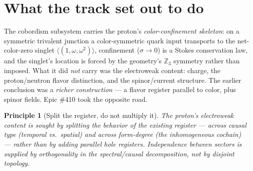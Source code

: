 \documentclass[11pt]{article}
\newtheorem{principle}{Principle}
\theoremstyle{definition}
\newcommand{\Z}{\mathbb{Z}}
\newcommand{\sigmacol}{\sigma}
\newcommand{\code}[1]{\texttt{#1}}
\begin{document}
\begin{abstract}
construction. The dimensional spike (\#418) and the dimension-generic apex interior (\#429,
\code{symmetricStackCells(nApexSlices)} with a rigorous \code{dualComplexIsValid} for
$n\ge4$, validated as a $4$-manifold over a tetrahedral $S^3$) scope the $3+1$\,D home and
expose the emergent twist as a PT-symmetric structure --- correctly read as
\emph{localized to creation/annihilation vertices} (St\"uckelberg--Feynman), not a
per-slice alternation. Finally, the track's findings force an \textbf{architecture pivot}:
the proton is assembled from \emph{sequences of bipartite junctions} relaxed in
\emph{one global step} with color-emergent creation, and the tripartite $W_{ABC}$ is
dropped. Charge lives in the emergent temporal sector, color in the register: the
charge\,$\otimes$\,color thesis. All numbers below are measured through the production
C++ and its Python suite; the open work (named, not created) is collected at the end.
\end{abstract}

\tableofcontents

\section{What the track set out to do}
\label{sec:intro}

The cobordism subsystem carries the proton's \emph{color-confinement skeleton}: on a
symmetric trivalent junction a color-symmetric quark input transports to the net-color-zero
singlet $\langle(1,\omega,\omega^2)\rangle$, confinement ($\sigmacol\to0$) is a Stokes
conservation law, and the singlet's location is forced by the geometry's $\Z_3$ symmetry
rather than imposed. What it did \emph{not} carry was the electroweak content: charge,
the proton/neutron flavor distinction, and the spinor/current structure. The earlier
conclusion was a \emph{richer construction} --- a flavor register parallel to color, plus
spinor fields. Epic \#410 took the opposite road.

\begin{principle}[Split the register, do not multiply it]
\label{prin:split}
The proton's electroweak content is sought by splitting the behavior of the
\emph{existing} register --- across causal type (temporal vs.\ spatial) and across
form-degree (the inhomogeneous cochain) --- rather than by adding parallel hole registers.
Independence between sectors is supplied by orthogonality in the spectral/causal
decomposition, not by disjoint topology.
\end{principle}
\end{document}
